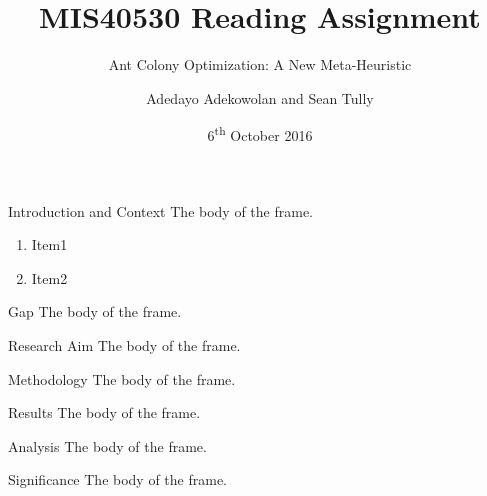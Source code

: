 \documentclass[aspectratio=169]{beamer}
\title{MIS40530 Reading Assignment}
\subtitle{Ant Colony Optimization: A New Meta-Heuristic}
\author{Adedayo Adekowolan and Sean Tully}
\institute{UCD}
\date{6\textsuperscript{th} October 2016}
\begin{document}
\begin{frame}
\titlepage
\end{frame}

\begin{frame}{Introduction and Context}
The body of the frame.
\begin{enumerate}
   \item Item1
   \item Item2
\end{enumerate}
\end{frame}

\begin{frame}{Gap}
The body of the frame.
\end{frame}

\begin{frame}{Research Aim}
The body of the frame.
\end{frame}

\begin{frame}{Methodology}
The body of the frame.
\end{frame}

\begin{frame}{Results}
The body of the frame.
\end{frame}

\begin{frame}{Analysis}
The body of the frame.
\end{frame}

\begin{frame}{Significance}
The body of the frame.
\end{frame}
\end{document}
